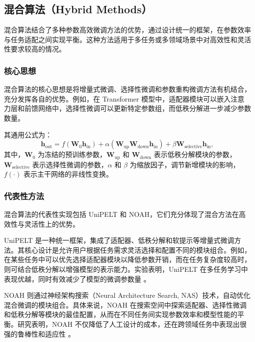 \documentclass[12pt,a4paper,twoside]{article} %
\begin{document}
\begin{multicols}{2}
\subsection{混合算法（Hybrid Methods）}

混合算法结合了多种参数高效微调方法的优势，通过设计统一的框架，在参数效率与任务适配之间实现平衡。这种方法适用于多任务或多领域场景中对高效性和灵活性要求较高的情况。

\subsubsection{核心思想}
混合算法的核心思想是将增量式微调、选择性微调和参数重构微调方法有机结合，充分发挥各自的优势。例如，在 Transformer 模型中，适配器模块可以嵌入注意力层和前馈网络中，选择性微调可以更新特定参数组，而低秩分解进一步减少参数数量。

其通用公式为：
\begin{equation}
\mathbf{h}_{\text{out}} = f(\mathbf{W}_0 \mathbf{h}_{\text{in}}) + \alpha (\mathbf{W}_{\text{up}} \mathbf{W}_{\text{down}} \mathbf{h}_{\text{in}}) + \beta \mathbf{W}_{\text{selective}} \mathbf{h}_{\text{in}},
\label{eq:hybrid}
\end{equation}
其中，$\mathbf{W}_0$ 为冻结的预训练参数，$\mathbf{W}_{\text{up}}$ 和 $\mathbf{W}_{\text{down}}$ 表示低秩分解模块的参数，$\mathbf{W}_{\text{selective}}$ 表示选择性微调的参数，$\alpha$ 和 $\beta$ 为缩放因子，调节新增模块的影响，$f(\cdot)$ 表示主干网络的非线性变换。

\subsubsection{代表性方法}
混合算法的代表性实现包括 UniPELT 和 NOAH，它们充分体现了混合方法在高效性与灵活性上的优势。

UniPELT 是一种统一框架，集成了适配器、低秩分解和软提示等增量式微调方法。其核心设计是允许用户根据任务需求灵活选择和配置不同的模块组合。例如，在某些任务中可以优先选择适配器模块以降低参数开销，而在任务复杂度较高时，则可结合低秩分解以增强模型的表示能力。实验表明，UniPELT 在多任务学习中表现优越，同时有效减少了模型的微调参数量 \cite{unipelt}。

NOAH 则通过神经架构搜索（Neural Architecture Search, NAS）技术，自动优化混合微调的模块组合。具体来说，NOAH 在搜索空间中探索适配器、选择性微调和低秩分解等模块的最佳配置，从而在不同任务间实现参数效率和模型性能的平衡。研究表明，NOAH 不仅降低了人工设计的成本，还在跨领域任务中表现出很强的鲁棒性和适应性 \cite{noah}。


\end{multicols}
\end{document}
